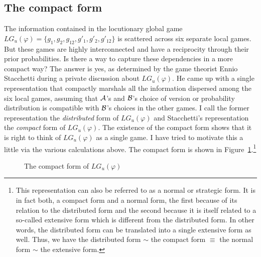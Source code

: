 \subsection{The compact form}

The information contained in the locutionary global game $LG_u(\varphi) = \{g_1, g_2,\allowbreak g_{12},\allowbreak g'_1,\allowbreak g'_2, g'_{12}\}$ is scattered across six separate local games. But these games are highly interconnected and have a reciprocity through their prior probabilities. Is there a way to capture these dependencies in a more compact way? The answer is yes, as determined by the game theorist Ennio Stacchetti during a private discussion about $LG_u(\varphi)$. He came up with a single representation that compactly marshals all the information dispersed among the six local games, assuming that $\cal A$'s and $\cal B$'s choice of version or probability distribution is compatible with $\cal B$'s choices in the other games. I call the former representation the \emph{distributed} form of $LG_u(\varphi)$ and Stacchetti's representation the \emph{compact} form of $LG_u(\varphi)$. The existence of the compact form shows that it is right to think of $LG_u(\varphi)$ as a single game. I have tried to motivate this a little via the various calculations above. The compact form is shown in Figure~\ref{fig:compact form}.\footnote{This representation can also be referred to as a normal or strategic form. It is in fact both, a compact form and a normal form, the first because of its relation to the distributed form and the second because it is itself related to a so-called extensive form which is different from the distributed form. In other words, the distributed form can be translated into a single extensive form as well. Thus, we have the distributed form $\sim$ the compact form $\equiv$ the normal form $\sim$ the extensive form.}

\begin{figure}[h]
\renewcommand{\arraystretch}{2.0}
 \caption{The compact form of $LG_u(\varphi)$} \label{fig:compact form}
\end{figure}

